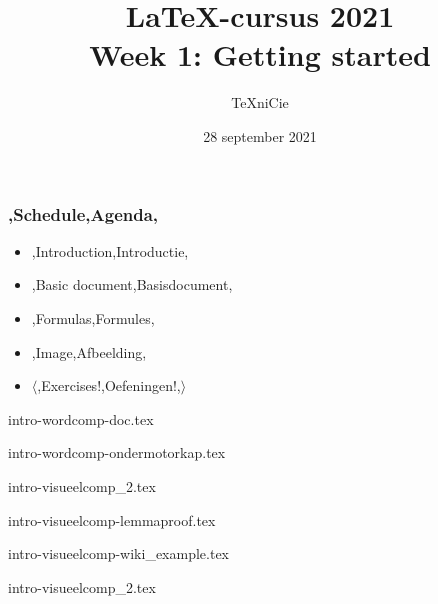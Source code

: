 \documentclass{cursuspresentatie}
\title[LaTeX-cursus 2021 -- Week 1]{%
	\texorpdfstring{\LaTeX{}-cursus 2021\\Week 1: Getting started}{%
		Week 1 -- LaTeX-cursus 2021%
	}%
}
\author{\TeX niCie}
\date{28 september 2021}
\def\importslide#1#2{%
	{#2}
}
\begin{document}



\begin{frame}
	\titlepage
	\centering
\end{frame}


\begin{frame}
	\frametitle{\lang,Schedule,Agenda,}
	
	\begin{itemize}
		\item \lang,Introduction,Introductie,
		\item \lang,Basic document,Basisdocument,
		\item \lang,Formulas,Formules,
		\item \lang,Image,Afbeelding,
		\item $ \mathbf\langle $\lang,Exercises!,Oefeningen!,$ \rangle $
	\end{itemize}
\end{frame}

	\clearrecentlist

    \def\assetdir{assets}
	
    \importslide{intro}{intro-wordcomp-doc.tex}

    \def\frameselection{2}
	\importslide{intro}{intro-wordcomp-ondermotorkap.tex}

	\def\frameselection{1-4}
	\importslide{intro}{intro-visueelcomp_2.tex}

	\importslide{intro}{intro-visueelcomp-lemmaproof.tex}
	\importslide{intro}{intro-visueelcomp-wiki_example.tex}

	\def\frameselection{5-}
	\importslide{intro}{intro-visueelcomp_2.tex}



\end{document}
